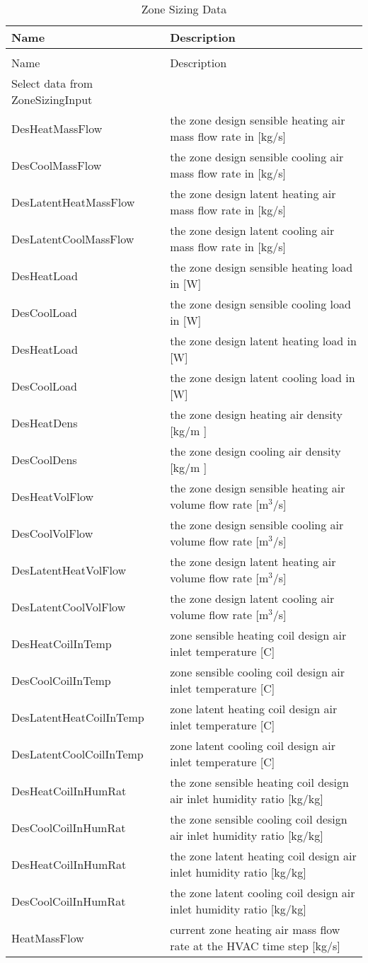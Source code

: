 \begin{longtable}[c]{p{1.85in}p{4.13in}}
\caption{Zone Sizing Data \label{table:zone-sizing-data}} \tabularnewline
\toprule 
Name & Description \tabularnewline
\midrule
\endfirsthead

\caption[]{Zone Sizing Data} \tabularnewline
\toprule 
Name & Description \tabularnewline
\midrule
\endhead

Select data from ZoneSizingInput &  \tabularnewline
DesHeatMassFlow & the zone design sensible heating air mass flow rate in [kg/s] \tabularnewline
DesCoolMassFlow & the zone design sensible cooling air mass flow rate in [kg/s] \tabularnewline
DesLatentHeatMassFlow & the zone design latent heating air mass flow rate in [kg/s] \tabularnewline
DesLatentCoolMassFlow & the zone design latent cooling air mass flow rate in [kg/s] \tabularnewline
DesHeatLoad & the zone design sensible heating load in [W] \tabularnewline
DesCoolLoad & the zone design sensible cooling load in [W] \tabularnewline
DesHeatLoad & the zone design latent heating load in [W] \tabularnewline
DesCoolLoad & the zone design latent cooling load in [W] \tabularnewline
DesHeatDens & the zone design heating air density [kg/m  ] \tabularnewline
DesCoolDens & the zone design cooling air density [kg/m  ] \tabularnewline
DesHeatVolFlow & the zone design sensible heating air volume flow rate [m\(^{3}\)/s] \tabularnewline
DesCoolVolFlow & the zone design sensible cooling air volume flow rate [m\(^{3}\)/s] \tabularnewline
DesLatentHeatVolFlow & the zone design latent heating air volume flow rate [m\(^{3}\)/s] \tabularnewline
DesLatentCoolVolFlow & the zone design latent cooling air volume flow rate [m\(^{3}\)/s] \tabularnewline
DesHeatCoilInTemp & zone sensible heating coil design air inlet temperature [C] \tabularnewline
DesCoolCoilInTemp & zone sensible cooling coil design air inlet temperature [C] \tabularnewline
DesLatentHeatCoilInTemp & zone latent heating coil design air inlet temperature [C] \tabularnewline
DesLatentCoolCoilInTemp & zone latent cooling coil design air inlet temperature [C] \tabularnewline
DesHeatCoilInHumRat & the zone sensible heating coil design air inlet humidity ratio [kg/kg] \tabularnewline
DesCoolCoilInHumRat & the zone sensible cooling coil design air inlet humidity ratio [kg/kg] \tabularnewline
DesHeatCoilInHumRat & the zone latent heating coil design air inlet humidity ratio [kg/kg] \tabularnewline
DesCoolCoilInHumRat & the zone latent cooling coil design air inlet humidity ratio [kg/kg] \tabularnewline
HeatMassFlow & current zone heating air mass flow rate at the HVAC time step [kg/s] \tabularnewline

\end{longtable}
